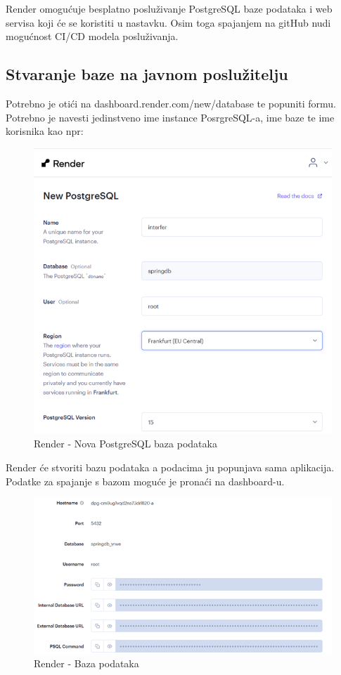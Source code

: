 Render omogućuje besplatno posluživanje PostgreSQL baze podataka i web servisa 
koji će se koristiti u nastavku. Osim toga spajanjem na gitHub nudi mogućnost 
CI/CD modela posluživanja.

\subsection{Stvaranje baze na javnom poslužitelju}

Potrebno je otići na dashboard.render.com/new/database te popuniti formu. 
Potrebno je navesti jedinstveno ime instance PosrgreSQL-a, ime baze te ime 
korisnika kao npr:

\begin{figure}[H]
	\includegraphics[scale=0.4]{slike/render_db.png}
	\centering
	\caption{Render - Nova PostgreSQL baza podataka}
	\label{fig:render_db1}
\end{figure}

Render će stvoriti bazu podataka a podacima ju popunjava sama aplikacija. 
Podatke za spajanje s bazom moguće je pronaći na dashboard-u.

\begin{figure}[H]
	\includegraphics[scale=0.4]{slike/render_db1.png}
	\centering
	\caption{Render - Baza podataka}
	\label{fig:render_db2}
\end{figure}

